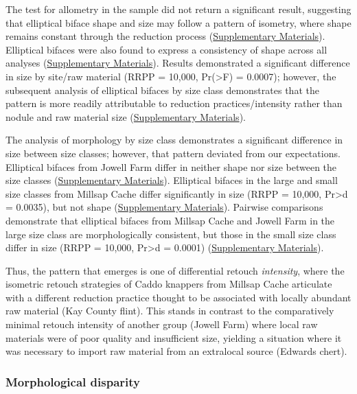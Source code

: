 \documentclass[]{interact}
\theoremstyle{plain}%
\theoremstyle{definition}
\theoremstyle{remark}
\begin{document}
The test for allometry in the sample did not return a significant
result, suggesting that elliptical biface shape and size may follow a
pattern of isometry, where shape remains constant through the reduction
process
(\href{https://seldenlab.github.io/elliptical.bifaces/}{Supplementary
Materials}). Elliptical bifaces were also found to express a consistency
of shape across all analyses
(\href{https://seldenlab.github.io/elliptical.bifaces/}{Supplementary
Materials}). Results demonstrated a significant difference in size by
site/raw material (RRPP = 10,000, Pr(\textgreater F) = 0.0007); however,
the subsequent analysis of elliptical bifaces by size class demonstrates
that the pattern is more readily attributable to reduction
practices/intensity rather than nodule and raw material size
(\href{https://seldenlab.github.io/elliptical.bifaces/}{Supplementary
Materials}).

The analysis of morphology by size class demonstrates a significant
difference in size between size classes; however, that pattern deviated
from our expectations. Elliptical bifaces from Jowell Farm differ in
neither shape nor size between the size classes
(\href{https://seldenlab.github.io/elliptical.bifaces/}{Supplementary
Materials}). Elliptical bifaces in the large and small size classes from
Millsap Cache differ significantly in size (RRPP = 10,000,
Pr\textgreater d = 0.0035), but not shape
(\href{https://seldenlab.github.io/elliptical.bifaces/}{Supplementary
Materials}). Pairwise comparisons demonstrate that elliptical bifaces
from Millsap Cache and Jowell Farm in the large size class are
morphologically consistent, but those in the small size class differ in
size (RRPP = 10,000, Pr\textgreater d = 0.0001)
(\href{https://seldenlab.github.io/elliptical.bifaces/}{Supplementary
Materials}).

Thus, the pattern that emerges is one of differential retouch
\emph{intensity}, where the isometric retouch strategies of Caddo
knappers from Millsap Cache articulate with a different reduction
practice thought to be associated with locally abundant raw material
(Kay County flint). This stands in contrast to the comparatively minimal
retouch intensity of another group (Jowell Farm) where local raw
materials were of poor quality and insufficient size, yielding a
situation where it was necessary to import raw material from an
extralocal source (Edwards chert).

\hypertarget{morphological-disparity}{%
\subsubsection{Morphological disparity}\label{morphological-disparity}}
\end{document}
